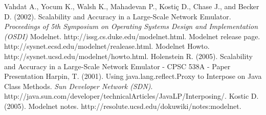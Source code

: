 \documentclass[a4paper,10pt]{report}
\begin{document}
\newpage{}
\begin{thebibliography}{5}
 Vahdat A., Yocum K., Walsh K., Mahadevan P., Kosti\c{c} D., Chase J., and Becker D. (2002). Scalability and Accuracy in a Large-Scale Network Emulator. \emph{Proceedings of 5th Symposium on Operating Systems Design and Implementation (OSDI)}
 Modelnet. http://issg.cs.duke.edu/modelnet.html.
 Modelnet release page. http://sysnet.ecsd.edu/modelnet/realease.html.
 Modelnet Howto. http://sysnet.ucsd.edu/modelnet/howto.html.
 Holenstein R. (2005). Scalability and Accuracy in a Large-Scale Network Emulator - CPSC 538A - Paper Presentation
 Harpin, T. (2001). Using java.lang.reflect.Proxy to Interpose on Java Class Methods. \emph{Sun Developer Network (SDN)}. http://java.sun.com/developer/technicalArticles/JavaLP/Interposing/.
 Kostic D. (2005). Modelnet notes. http://resolute.ucsd.edu/dokuwiki/notes:modelnet.
\end{thebibliography}
\end{document}
